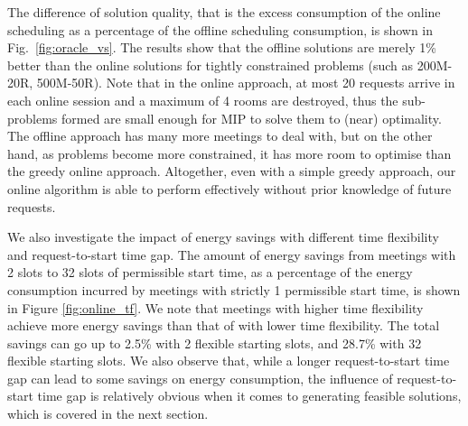 The difference of solution quality, that is the excess consumption of the online scheduling as a percentage of the offline scheduling consumption, is shown in Fig.~\ref{fig:oracle_vs}. The results show that the offline solutions are merely 1\% better than the online solutions for tightly constrained problems (such as 200M-20R, 500M-50R). Note that in the online approach, at most 20 requests arrive in each online session and a maximum of 4 rooms are destroyed, thus the sub-problems formed are small enough for MIP to solve them to (near) optimality. The offline approach has many more meetings to deal with, but on the other hand, as problems become more constrained, it has more room to optimise than the greedy online approach. Altogether, even with a simple greedy approach, our online algorithm is able to perform effectively without prior knowledge of future requests. 

We also investigate the impact of energy savings with different time flexibility and request-to-start time gap. 
The amount of energy savings from meetings with 2 slots to 32 slots of permissible start time, as a percentage of the energy consumption incurred by meetings with strictly 1 permissible start time, is shown in Figure \ref{fig:online_tf}. We note that meetings with higher time flexibility achieve more energy savings than that of with lower time flexibility. The total savings can go up to 2.5\% with 2 flexible starting slots, and 28.7\% with 32 flexible starting slots. We also observe that, while a longer request-to-start time gap can lead to some savings on energy consumption, the influence of request-to-start time gap is relatively obvious when it comes to generating feasible solutions, which is covered in the next section.


